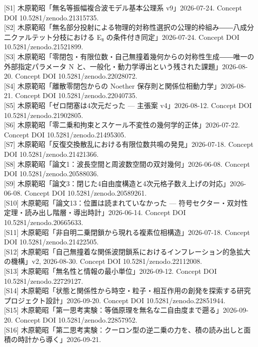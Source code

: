 \documentclass[
  a4paper,
]{ltjsarticle}
\begin{document}
{[}S1{]} 木原範昭「無名等振幅複合波モデル基本公理系 v9」2026-07-24.
Concept DOI 10.5281/zenodo.21315735.\\
{[}S2{]}
木原範昭「無名部分投射による物理的対称性選択の公理的枠組み――八成分二クァルテット分枝における
E₈ の条件付き同定」2026-07-24. Concept DOI 10.5281/zenodo.21521899.\\
{[}S3{]}
木原範昭「零閉包・有限位数・自己無撞着幾何からの対称性生成――唯一の外部指定パラメータ
N と、一般化・動力学導出という残された課題」2026-08-20. Concept DOI
10.5281/zenodo.22028072.\\
{[}S4{]} 木原範昭「離散零閉包からの Noether
保存則と関係位相動力学」2026-08-21. Concept DOI
10.5281/zenodo.22040735.\\
{[}S5{]} 木原範昭「ゼロ閉塞は4次元だった --- 主張案 v4」2026-08-12.
Concept DOI 10.5281/zenodo.21902805.\\
{[}S6{]}
木原範昭「零二乗和拘束とスケール不変性の幾何学的正体」2026-07-22.
Concept DOI 10.5281/zenodo.21495305.\\
{[}S7{]} 木原範昭「反復交換散乱における有限位数共鳴の発見」2026-07-18.
Concept DOI 10.5281/zenodo.21421366.\\
{[}S8{]} 木原範昭「論文1：波長空間と周波数空間の双対幾何」2026-06-08.
Concept DOI 10.5281/zenodo.20588036.\\
{[}S9{]}
木原範昭「論文3：閉じた4自由度構造と4次元格子数え上げの対応」2026-06-08.
Concept DOI 10.5281/zenodo.20589261.\\
{[}S10{]} 木原範昭「論文13：位置は読まれていなかった ---
符号セクター・双対性定理・読み出し階層・導出時計」2026-06-14. Concept
DOI 10.5281/zenodo.20665633.\\
{[}S11{]} 木原範昭「非自明二乗閉鎖から現れる複素位相構造」2026-07-18.
Concept DOI 10.5281/zenodo.21422505.\\
{[}S12{]}
木原範昭「自己無撞着な関係波閉鎖系におけるインフレーション的急拡大の機構」v2,
2026-08-30. Concept DOI 10.5281/zenodo.22112008.\\
{[}S13{]} 木原範昭「無名性と情報の最小単位」2026-09-12. Concept DOI
10.5281/zenodo.22729127.\\
{[}S14{]}
木原範昭「状態と関係性から時空・粒子・相互作用の創発を探索する研究プロジェクト設計」2026-09-20.
Concept DOI 10.5281/zenodo.22851944.\\
{[}S15{]}
木原範昭「第一思考実験：等価原理を無名な二自由度まで遡る」2026-09-20.
Concept DOI 10.5281/zenodo.22857952.\\
{[}S16{]}
木原範昭「第二思考実験：クーロン型の逆二乗の力を、積の読み出しと面積の時計から導く」2026-09-21.
\end{document}
